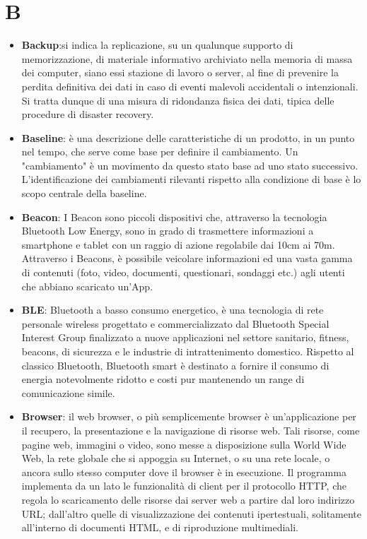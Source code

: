 \section{B}
\begin{itemize} 
	\item
	\textbf{Backup}:si indica la replicazione, su un qualunque supporto di memorizzazione, di materiale informativo archiviato nella memoria di massa dei computer, siano essi stazione di lavoro o server, al fine di prevenire la perdita definitiva dei dati in caso di eventi malevoli accidentali o intenzionali. Si tratta dunque di una misura di ridondanza fisica dei dati, tipica delle procedure di disaster recovery.
	\item
	\textbf{Baseline}: è una descrizione delle caratteristiche di un prodotto, in un punto nel tempo, che serve come base per definire il cambiamento. Un "cambiamento" è un movimento da questo stato base ad uno stato successivo. L'identificazione dei cambiamenti rilevanti rispetto alla condizione di base è lo scopo centrale della baseline.
	\item
	\textbf{Beacon}: I Beacon sono piccoli dispositivi che, attraverso la tecnologia Bluetooth Low Energy, sono in grado di trasmettere informazioni a smartphone e tablet con un raggio di azione regolabile dai 10cm ai 70m. Attraverso i Beacons, è possibile veicolare informazioni ed una vasta gamma di contenuti (foto, video, documenti, questionari, sondaggi etc.) agli utenti che abbiano scaricato un'App.
	\item
	\textbf{BLE}: Bluetooth a basso consumo energetico, è una tecnologia di rete personale wireless progettato e commercializzato dal Bluetooth Special Interest Group finalizzato a nuove applicazioni nel settore sanitario, fitness, beacons, di sicurezza e le industrie di intrattenimento domestico. Rispetto al classico Bluetooth, Bluetooth smart è destinato a fornire il consumo di energia notevolmente ridotto e costi pur mantenendo un range di comunicazione simile.
	\item
	\textbf{Browser}: il web browser, o più semplicemente browser è un'applicazione per il recupero, la presentazione e la navigazione di risorse web. Tali risorse, come pagine web, immagini o video, sono messe a disposizione sulla World Wide Web, la rete globale che si appoggia su Internet, o su una rete locale, o ancora sullo stesso computer dove il browser è in esecuzione. Il programma implementa da un lato le funzionalità di client per il protocollo HTTP, che regola lo scaricamento delle risorse dai server web a partire dal loro indirizzo URL; dall'altro quelle di visualizzazione dei contenuti ipertestuali, solitamente all'interno di documenti HTML, e di riproduzione multimediali.
\end{itemize}